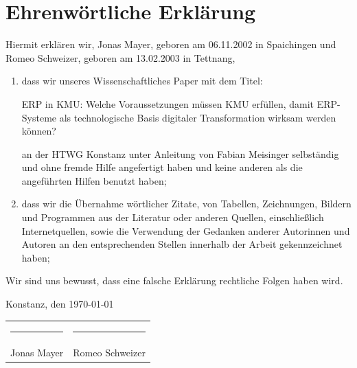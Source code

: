 
\chapter*{Ehrenwörtliche Erklärung}

Hiermit erklären wir, Jonas Mayer, geboren am 06.11.2002 in Spaichingen und Romeo Schweizer, geboren am 13.02.2003 in Tettnang,

\begin{enumerate}
\item dass wir unseres Wissenschaftliches Paper mit dem Titel:

\glqq ERP in KMU: Welche Voraussetzungen müssen KMU erfüllen, damit ERP-Systeme als technologische Basis digitaler 
Transformation wirksam werden können?\grqq{}

an der HTWG Konstanz unter Anleitung von Fabian Meisinger selbständig und ohne fremde Hilfe angefertigt haben und 
keine anderen als die angeführten Hilfen benutzt haben;

\item dass wir die Übernahme wörtlicher Zitate, von Tabellen, Zeichnungen, Bildern und Programmen aus der Literatur 
oder anderen Quellen, einschließlich Internetquellen, sowie die Verwendung der Gedanken anderer Autorinnen und 
Autoren an den entsprechenden Stellen innerhalb der Arbeit gekennzeichnet haben;


\end{enumerate}

Wir sind uns bewusst, dass eine falsche Erklärung rechtliche Folgen haben wird.

\vfill

\noindent
Konstanz, den \today

\vspace{1cm}

\noindent
\begin{tabular}{p{6cm}p{6cm}}
\rule{6cm}{0.4pt} & \rule{6cm}{0.4pt} \\
Jonas Mayer & Romeo Schweizer
\end{tabular}


